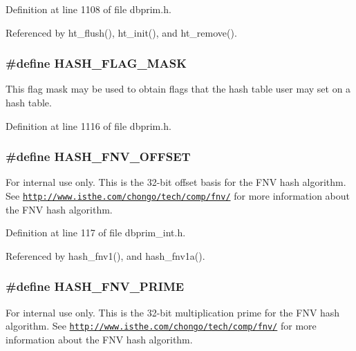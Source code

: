 Definition at line 1108 of file dbprim.h.

Referenced by ht\_\-flush(), ht\_\-init(), and ht\_\-remove().\hypertarget{group__dbprim__hash_ga25}{
\subsubsection[HASH\_\-FLAG\_\-MASK]{\setlength{\rightskip}{0pt plus 5cm}\#define HASH\_\-FLAG\_\-MASK}}
\label{group__dbprim__hash_ga25}


This flag mask may be used to obtain flags that the hash table user may set on a hash table.

Definition at line 1116 of file dbprim.h.\hypertarget{group__dbprim__hash_ga50}{
\subsubsection[HASH\_\-FNV\_\-OFFSET]{\setlength{\rightskip}{0pt plus 5cm}\#define HASH\_\-FNV\_\-OFFSET}}
\label{group__dbprim__hash_ga50}


\begin{Desc}
\item[For internal use only.]
This is the 32-bit offset basis for the FNV hash algorithm. See \href{http://www.isthe.com/chongo/tech/comp/fnv/}{\tt http://www.isthe.com/chongo/tech/comp/fnv/} for more information about the FNV hash algorithm.\end{Desc}


Definition at line 117 of file dbprim\_\-int.h.

Referenced by hash\_\-fnv1(), and hash\_\-fnv1a().\hypertarget{group__dbprim__hash_ga51}{
\subsubsection[HASH\_\-FNV\_\-PRIME]{\setlength{\rightskip}{0pt plus 5cm}\#define HASH\_\-FNV\_\-PRIME}}
\label{group__dbprim__hash_ga51}


\begin{Desc}
\item[For internal use only.]
This is the 32-bit multiplication prime for the FNV hash algorithm. See \href{http://www.isthe.com/chongo/tech/comp/fnv/}{\tt http://www.isthe.com/chongo/tech/comp/fnv/} for more information about the FNV hash algorithm.\end{Desc}


